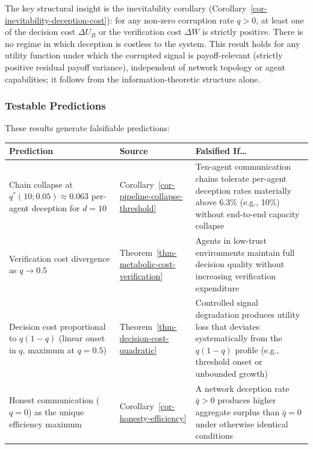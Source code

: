 \documentclass[11pt]{article}
\theoremstyle{plain}
\theoremstyle{definition}
\theoremstyle{remark}
\newcounter{none}
\let\origsubsubsection\subsubsection
\renewcommand{\subsubsection}{\needspace{4\baselineskip}\origsubsubsection}
\begin{document}
The key structural insight is the inevitability corollary
(Corollary~\ref{cor-inevitability-deception-cost}): for any non-zero
corruption rate \(q > 0\), at least one of the decision cost
\(\Delta U_B\) or the verification cost \(\Delta W\) is strictly
positive. There is no regime in which deception is costless to the
system. This result holds for any utility function under which the
corrupted signal is payoff-relevant (strictly positive residual payoff
variance), independent of network topology or agent capabilities; it
follows from the information-theoretic structure alone.

\subsubsection{Testable Predictions}\label{testable-predictions-1}

These results generate falsifiable predictions:

{\def\LTcaptype{none} %
\begin{longtable}[]{@{}
  >{\raggedright\arraybackslash}p{}
  >{\raggedright\arraybackslash}p{}
  >{\raggedright\arraybackslash}p{}@{}}
\toprule\noalign{}
\begin{minipage}[b]{\linewidth}\raggedright
Prediction
\end{minipage} & \begin{minipage}[b]{\linewidth}\raggedright
Source
\end{minipage} & \begin{minipage}[b]{\linewidth}\raggedright
Falsified If\ldots{}
\end{minipage} \\
\midrule\noalign{}
\endhead
\bottomrule\noalign{}
\endlastfoot
Chain collapse at \(q^*(10; 0.05) \approx 0.063\) per-agent deception
for \(d = 10\) & Corollary~\ref{cor-pipeline-collapse-threshold} &
Ten-agent communication chains tolerate per-agent deception rates
materially above 6.3\% (e.g., 10\%) without end-to-end capacity
collapse \\
Verification cost divergence as \(q \to 0.5\) &
Theorem~\ref{thm-metabolic-cost-verification} & Agents in low-trust
environments maintain full decision quality without increasing
verification expenditure \\
Decision cost proportional to \(q(1-q)\) (linear onset in \(q\), maximum
at \(q = 0.5\)) & Theorem~\ref{thm-decision-cost-quadratic} & Controlled
signal degradation produces utility loss that deviates systematically
from the \(q(1-q)\) profile (e.g., threshold onset or unbounded
growth) \\
Honest communication (\(q = 0\)) as the unique efficiency maximum &
Corollary~\ref{cor-honesty-efficiency} & A network deception rate
\(\bar{q} > 0\) produces higher aggregate surplus than \(\bar{q} = 0\)
under otherwise identical conditions \\
\end{longtable}
}
\end{document}
